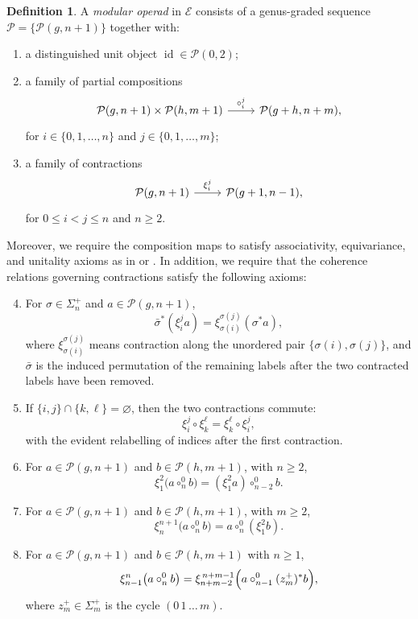 \documentclass{amsart}
\newcommand{\bE}{\mathscr{E}}
\newcommand{\calP}{\mathcal{P}}
\newcommand{\id}{\operatorname{id}}
\theoremstyle{definition}
\newtheorem{definition}[theorem]{Definition}%
\numberwithin{equation}{section}
\begin{document}
\begin{definition}\label{def: modular operad}
A \emph{modular operad} in $\bE$ consists of a genus-graded sequence $\calP=\{\calP(g,n+1)\}$ together with:
\begin{enumerate}
 \item a distinguished unit object $\id\in\calP(0,2)$;
 \item a family of partial compositions
 \[
 \begin{tikzcd}
 \calP(g,n+1)\times \calP(h,m+1)\arrow[r,"\circ_{i}^{j}"]& \calP(g+h, n+m),
 \end{tikzcd}
 \]
 for $i\in\{0,1,\ldots,n\}$ and $j\in\{0,1,\ldots,m\}$;
 \item a family of contractions
 \[
 \begin{tikzcd}
 \calP(g,n+1)\arrow[r,"\xi_{i}^{j}"]& \calP(g+1,n-1),
 \end{tikzcd}
 \]
 for $0\leq i<j\leq n$ and $n\geq 2$.
\end{enumerate}
Moreover, we require the composition maps to satisfy associativity, equivariance, and unitality axioms as in \cite[Definition~3.3.1]{hv_cyclic} or \cite[Theorem~3.7]{gk_modular}. In addition, we require that the coherence relations governing contractions satisfy the following axioms: 
\begin{enumerate}
\setcounter{enumi}{3}
\item For $\sigma\in\Sigma_n^+$ and $a\in\calP(g,n+1)$,
\[
\bar\sigma^*(\xi_i^j a) = \xi_{\sigma(i)}^{\sigma(j)}(\sigma^*a),
\]
where $\xi_{\sigma(i)}^{\sigma(j)}$ means contraction along the unordered pair $\{\sigma(i),\sigma(j)\}$, and $\bar\sigma$ is the induced permutation of the remaining labels after the two contracted labels have been removed.
\item If $\{i,j\}\cap\{k,\ell\}=\varnothing$, then the two contractions commute:
\[
\xi_i^j\circ \xi_k^\ell
=
\xi_k^\ell\circ \xi_i^j,
\]
with the evident relabelling of indices after the first contraction.

\item For $a\in\calP(g,n+1)$ and $b\in\calP(h,m+1)$, with $n\geq 2$,
\[
\xi_1^2\bigl(a\circ_n^0 b\bigr) = (\xi_1^2 a)\circ_{n-2}^0 b.
\]

\item For $a\in\calP(g,n+1)$ and $b\in\calP(h,m+1)$, with $m\geq 2$,
\[
\xi_n^{n+1}\bigl(a\circ_n^0 b\bigr) = a\circ_n^0(\xi_1^2 b).
\]

\item For $a\in\calP(g,n+1)$ and $b\in\calP(h,m+1)$ with $n\ge 1$,
\[
\xi_{n-1}^{n}\bigl(a\circ_n^0 b\bigr)
=
\xi_{n+m-2}^{\,n+m-1}\Bigl(a\circ_{n-1}^0 (z_m^+)^*b\Bigr),
\]
where $z_{m}^+\in \Sigma_m^+$ is the cycle $(0\,1\,\dots\,m)$.
\end{enumerate}


\end{definition}
\end{document}
